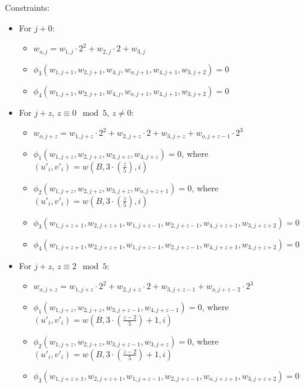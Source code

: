 Constraints:
\begin{itemize}
    \item For $j + 0$:
    \begin{itemize}
        \item $w_{o, j} = w_{1, j} \cdot 2^2 + w_{2, j} \cdot 2 + w_{3, j}$
        \item $\phi_3(w_{1, j + 1}, w_{2, j + 1}, w_{4, j}, w_{o, j + 1}, w_{4, j + 1}, w_{3, j + 2}) = 0$
        \item $\phi_4(w_{1, j + 1}, w_{2, j + 1}, w_{4, j}, w_{o, j + 1}, w_{4, j + 1}, w_{3, j + 2}) = 0$
    \end{itemize}
    \item For $j + z$, $z \equiv 0 \mod 5$, $z \neq 0$:
    \begin{itemize}
        \item $w_{o, j + z} = w_{1, j + z} \cdot 2^2 + w_{2, j + z} \cdot 2 + w_{3, j + z} + w_{o, j + z - 1} \cdot 2^3$
        \item $\phi_1(w_{1, j + z}, w_{2, j + z}, w_{3, j + z}, w_{4, j + z}) = 0$, where $(u'_{i}, v'_{i}) = w(B, 3 \cdot (\frac{z}{5}), i)$
        \item $\phi_2(w_{1, j + z}, w_{2, j + z}, w_{3, j + z}, w_{o, j + z + 1}) = 0$, where $(u'_{i}, v'_{i}) = w(B, 3 \cdot (\frac{z}{5}), i)$
        \item $\phi_3(w_{1, j + z + 1}, w_{2, j + z + 1}, w_{1, j + z - 1}, w_{2, j + z - 1}, w_{4, j + z + 1}, w_{3, j + z + 2}) = 0$
        \item $\phi_4(w_{1, j + z + 1}, w_{2, j + z + 1}, w_{1, j + z - 1}, w_{2, j + z - 1}, w_{4, j + z + 1}, w_{3, j + z + 2}) = 0$
    \end{itemize}
    \item For $j + z$, $z \equiv 2 \mod 5$:
    \begin{itemize}
        \item $w_{o, j + z} = w_{1, j + z} \cdot 2^2 + w_{2,j + z} \cdot 2 + w_{3, j + z - 1} + w_{o, j+ z - 2} \cdot 2^3$
        \item $\phi_1(w_{1, j + z}, w_{2, j + z}, w_{3, j + z - 1}, w_{4, j + z - 1}) = 0$, where $(u'_{i}, v'_{i}) = w(B, 3 \cdot (\frac{z - 2}{5}) + 1, i)$
        \item $\phi_2(w_{1, j + z}, w_{2, j + z}, w_{3, j + z - 1}, w_{3, j + z}) = 0$, where $(u'_{i}, v'_{i}) = w(B, 3 \cdot (\frac{z - 2}{5}) + 1, i)$
        \item $\phi_3(w_{1, j + z + 1}, w_{2, j + z + 1}, w_{1, j + z - 1}, w_{2, j + z - 1}, w_{o, j + z + 1}, w_{3, j + z + 2}) = 0$

\end{itemize}
\end{itemize}
